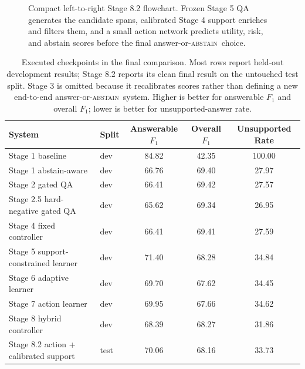\documentclass[10pt,twocolumn]{article}
\newcommand{\abstain}{\textsc{abstain}}
\begin{document}
\begin{figure}[t]
  \centering
  \resizebox{0.98\textwidth}{!}{}
  \caption{Compact left-to-right Stage 8.2 flowchart.
  Frozen Stage 5 QA generates the candidate spans, calibrated Stage 4 support
  enriches and filters them, and a small action network predicts utility,
  risk, and abstain scores before the final answer-or-\abstain\ choice.}
  \label{fig:summary-stage8-2-architecture}
\end{figure}

\begin{table}[t]
  \centering
  \caption{Executed checkpoints in the final comparison.
  Most rows report held-out development results; Stage 8.2 reports its clean
  final result on the untouched test split.
  Stage 3 is omitted because it recalibrates scores rather than defining a new
  end-to-end answer-or-\abstain\ system.
  Higher is better for answerable \(F_1\) and overall \(F_1\); lower is better
  for unsupported-answer rate.}
  \label{tab:summary-results}
  \small
  \begin{tabular}{@{}llccc@{}}
    \toprule
    System & Split & Answerable \(F_1\) & Overall \(F_1\) & Unsupported Rate \\
    \midrule
    Stage 1 baseline & dev & 84.82 & 42.35 & 100.00 \\
    Stage 1 abstain-aware & dev & 66.76 & 69.40 & 27.97 \\
    Stage 2 gated QA & dev & 66.41 & 69.42 & 27.57 \\
    Stage 2.5 hard-negative gated QA & dev & 65.62 & 69.34 & 26.95 \\
    Stage 4 fixed controller & dev & 66.41 & 69.41 & 27.59 \\
    Stage 5 support-constrained learner & dev & 71.40 & 68.28 & 34.84 \\
    Stage 6 adaptive learner & dev & 69.70 & 67.62 & 34.45 \\
    Stage 7 action learner & dev & 69.95 & 67.66 & 34.62 \\
    Stage 8 hybrid controller & dev & 68.39 & 68.27 & 31.86 \\
    Stage 8.2 action + calibrated support & test & 70.06 & 68.16 & 33.73 \\
    \bottomrule
  \end{tabular}
\end{table}
\end{document}
